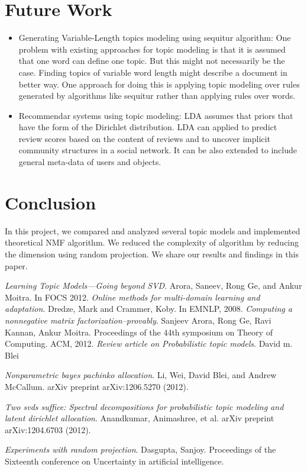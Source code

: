 \documentclass[a4paper,11pt]{article}
\begin{document}
\section{Future Work}

\begin{itemize}

\item Generating Variable-Length topics modeling using sequitur algorithm:
	One problem with existing approaches for topic modeling is that it is assumed that one word can define one topic. But this might not necessarily be the case. Finding topics of variable word length might describe a document in better way. One approach for doing this is applying topic modeling over rules generated by algorithms like sequitur rather than applying rules over words.

\item Recommendar systems using topic modeling:
	LDA assumes that priors that have the form of the Dirichlet distribution. LDA can applied to predict review scores based on the content of reviews and to uncover implicit community structures in a social network. It can be also extended to include general meta-data of users and objects.

\end{itemize}

\section{Conclusion}
In this project, we compared and analyzed several topic models and implemented theoretical NMF algorithm. We reduced the complexity of algorithm by reducing the dimension using random projection. We share our results and findings in this paper. 


\begin{thebibliography}{99}
 \textit{Learning Topic Models---Going beyond SVD}. Arora, Saneev, Rong Ge, and Ankur Moitra. In FOCS 2012.
 \textit{Online methods for multi-domain learning and adaptation}. Dredze, Mark and Crammer, Koby. In
EMNLP, 2008.
 \textit{Computing a nonnegative matrix factorization--provably}. Sanjeev Arora, Rong Ge, Ravi Kannan, Ankur Moitra. Proceedings of the 44th symposium on Theory of Computing. ACM, 2012.  
 \textit{Review article on Probabilistic topic models}. David m. Blei  

 \textit{Nonparametric bayes pachinko allocation}. Li, Wei, David Blei, and Andrew McCallum. arXiv preprint arXiv:1206.5270 (2012). 

 \textit{Two svds suffice: Spectral decompositions for probabilistic topic modeling and latent dirichlet allocation}. Anandkumar, Animashree, et al.  arXiv preprint arXiv:1204.6703 (2012).

 \textit{Experiments with random projection}. Dasgupta, Sanjoy. Proceedings of the Sixteenth conference on Uncertainty in artificial intelligence.


\end{thebibliography}

\pagebreak
\end{document}
